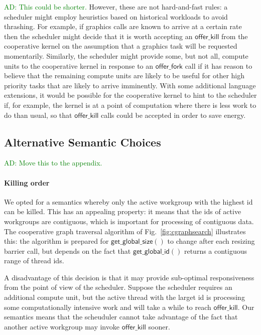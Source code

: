 \documentclass[numbers,nocopyrightspace,10pt]{sigplanconf}
\newcommand{\ADComment}[1]{\textcolor{green}{AD: #1}}
\newcommand{\myfig}{Fig.~}
\newcommand{\offerfork}{\mathsf{offer\_fork}}
\newcommand{\offerkill}{\mathsf{offer\_kill}}
\newcommand{\getglobalid}{\mathsf{get\_global\_id}}
\newcommand{\getglobalsize}{\mathsf{get\_global\_size}}
\begin{document}
\ADComment{This could be shorter.}
However, these are not hard-and-fast rules: a scheduler might employ
heuristics based on historical workloads to avoid thrashing.  For
example, if graphics calls are known to arrive at a certain rate then
the scheduler might decide that it is worth accepting an $\offerkill$
from the cooperative kernel on the assumption that a graphics task
will be requested momentarily.  Similarly, the scheduler might provide
some, but not all, compute units to the cooperative kernel in response
to an $\offerfork$ call if it has reason to believe that the remaining
compute units are likely to be useful for other high priority tasks
that are likely to arrive imminently.  With some additional language extensions, it would be possible for the cooperative kernel to hint to the scheduler if, for example, the kernel is at a point of computation where there is less work to do than usual, so that $\offerkill$ calls could be accepted in order to save energy.


\subsection{Alternative Semantic Choices}\label{sec:semanticalternatives}

\ADComment{Move this to the appendix.}

\paragraph{Killing order}

We opted for a semantics whereby only the active workgroup with the
highest id can be killed.  This has an appealing property: it means
that the ids of active workgroups are contiguous, which is important
for processing of contiguous data.  The cooperative graph traversal
algorithm of \myfig\ref{fig:cgraphsearch} illustrates this: the algorithm is prepared
for $\getglobalsize()$ to change after each resizing barrier call, but
depends on the fact that $\getglobalid()$ returns a contiguous range
of thread ids.

A disadvantage of this decision is that it may provide sub-optimal
responsiveness from the point of view of the scheduler.  Suppose the
scheduler requires an additional compute unit, but the active thread
with the larget id is processing some computationally intensive work
and will take a while to reach $\offerkill$.  Our semantics means that
the scheuduler cannot take advantage of the fact that another active
workgroup may invoke $\offerkill$ sooner.
\end{document}
